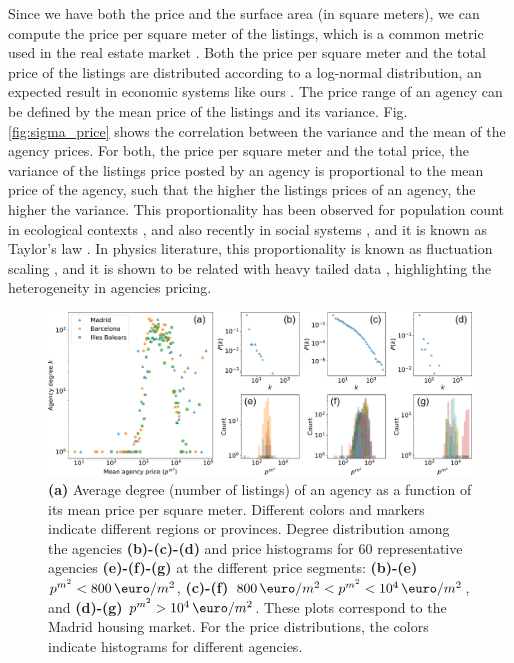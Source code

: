Since we have both the price and the surface area (in square meters), we can compute the price per square meter of the listings, which is a common metric used in the real estate market \cite{}. Both the price per square meter and the total price of the listings are distributed according to a log-normal distribution, an expected result in economic systems like ours \cite{}. The price range of an agency can be defined by the mean price of the listings and its variance. Fig. \ref{fig:sigma_price} shows the correlation between the variance and the mean of the agency prices. For both, the price per square meter and the total price, the variance of the listings price posted by an agency is proportional to the mean price of the agency, such that the higher the listings prices of an agency, the higher the variance. This proportionality has been observed for population count in ecological contexts \cite{Violeta cites}, and also recently in social systems \cite{Violeta citation}, and it is known as Taylor's law \cite{}. In physics literature, this proportionality is known as fluctuation scaling \cite{}, and it is shown to be related with heavy tailed data \cite{PNAS_Brown_2021}, highlighting the heterogeneity in agencies pricing.

\begin{figure}
    \centering
    \includegraphics[width =\textwidth]{Figs/Idealista_dynamics/panel_price.pdf}
	\caption[Price segmentation by the degree.]{\textbf{(a)} Average degree (number of listings) of an agency as a function of its mean price per square meter. Different colors and markers indicate different regions or provinces. Degree distribution among the agencies \textbf{(b)-(c)-(d)} and price histograms for 60 representative agencies \textbf{(e)-(f)-(g)} at the different price segments: \textbf{(b)-(e)} $p^{{m}^2} < 800 \, \textup{\euro} / m^2$, \textbf{(c)-(f)} $800 \, \textup{\euro}  / m^2 < p^{{m}^2} < 10^4 \, \textup{\euro}  / m^2$, and \textbf{(d)-(g)} $p^{{m}^2} > 10^4 \, \textup{\euro}  / m^2$. These plots correspond to the Madrid housing market. For the price distributions, the colors indicate histograms for different agencies. \label{fig:panel_price}}
\end{figure}

